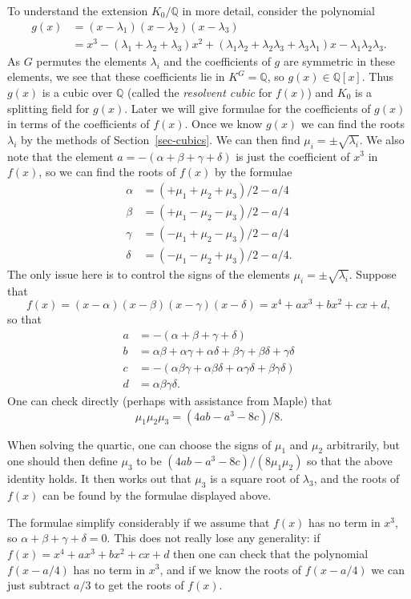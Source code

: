 \documentclass{amsart}
\newcommand{\Q}         {{\mathbb{Q}}}
\newcommand{\al}        {\alpha}
\newcommand{\bt}        {\beta}
\newcommand{\gm}        {\gamma}
\newcommand{\dl}        {\delta}
\newcommand{\lm}        {\lambda}
\renewcommand{\:}{\colon}
\theoremstyle{definition}
\begin{document}
To understand the extension $K_0/\Q$ in more detail, consider the
polynomial 
\begin{align*}
 g(x) &= (x-\lm_1)(x-\lm_2)(x-\lm_3) \\
  &= x^3 - (\lm_1+\lm_2+\lm_3) x^2 + 
     (\lm_1\lm_2+\lm_2\lm_3+\lm_3\lm_1) x - \lm_1\lm_2\lm_3.
\end{align*}
As $G$ permutes the elements $\lm_i$ and the coefficients of $g$ are
symmetric in these elements, we see that these coefficients lie in
$K^G=\Q$, so $g(x)\in\Q[x]$.  Thus $g(x)$ is a cubic over $\Q$ (called
the \emph{resolvent cubic} for $f(x)$) and $K_0$ is a splitting field
for $g(x)$.  Later we will give formulae for the coefficients of
$g(x)$ in terms of the coefficients of $f(x)$.  Once we know $g(x)$ we
can find the roots $\lm_i$ by the methods of
Section~\ref{sec-cubics}.  We can then find $\mu_i=\pm\sqrt{\lm_i}$.
We also note that the element $a=-(\al+\bt+\gm+\dl)$ is just the
coefficient of $x^3$ in $f(x)$, so we can find the roots of $f(x)$ by
the formulae 
\begin{align*}
 \al &= (+\mu_1+\mu_2+\mu_3)/2-a/4 \\
 \bt &= (+\mu_1-\mu_2-\mu_3)/2-a/4 \\
 \gm &= (-\mu_1+\mu_2-\mu_3)/2-a/4 \\
 \dl &= (-\mu_1-\mu_2+\mu_3)/2-a/4.
\end{align*}
The only issue here is to control the signs of the elements
$\mu_i=\pm\sqrt{\lm_i}$.  Suppose that 
\[ f(x) = (x-\al)(x-\bt)(x-\gm)(x-\dl) = 
    x^4 + ax^3 + bx^2 + cx + d,
\]
so that 
\begin{align*}
 a &= -(\al+\bt+\gm+\dl) \\
 b &= \al\bt+\al\gm+\al\dl+\bt\gm+\bt\dl+\gm\dl \\
 c &= -(\al\bt\gm + \al\bt\dl + \al\gm\dl + \bt\gm\dl) \\
 d &= \al\bt\gm\dl.
\end{align*}
One can check directly (perhaps with assistance from Maple) that 
\[ \mu_1\mu_2\mu_3 = (4ab - a^3 - 8c)/8. \]

When solving the quartic, one can choose the signs of $\mu_1$ and
$\mu_2$ arbitrarily, but one should then define $\mu_3$ to be 
$(4ab-a^3-8c)/(8\mu_1\mu_2)$ so that the above identity holds.  It
then works out that $\mu_3$ is a square root of $\lm_3$, and the roots
of $f(x)$ can be found by the formulae displayed above.

The formulae simplify considerably if we assume that $f(x)$ has no
term in $x^3$, so $\al+\bt+\gm+\dl=0$.  This does not really lose any
generality: if $f(x)=x^4+ax^3+bx^2+cx+d$ then one can check that the
polynomial $f(x-a/4)$ has no term in $x^3$, and if we know the roots
of $f(x-a/4)$ we can just subtract $a/3$ to get the roots of $f(x)$.  
\end{document}
